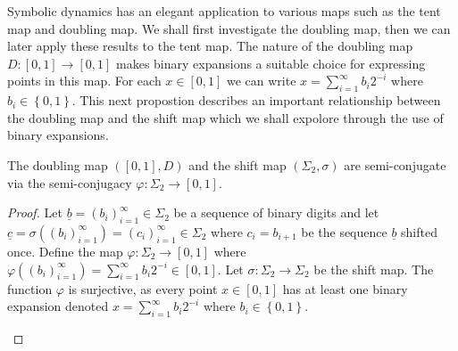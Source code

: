 Symbolic dynamics has an elegant application to various maps such as the tent map and doubling map. We shall first investigate the doubling map, then we can later apply these results to the tent map. The nature of the doubling map $D: [0, 1] \to [0, 1]$ makes binary expansions a suitable choice for expressing points in this map. For each $x \in [0, 1]$ we can write $x=\sum_{i=1}^{\infty}b_i2^{-i}$ where $b_i \in \left\lbrace 0, 1 \right\rbrace$. This next propostion describes an important relationship between the doubling map and the shift map which we shall expolore through the use of binary expansions.

\begin{prop} \label{prop:doubling-shift-semi-conjugate}
    The doubling map $([0, 1], D)$ and the shift map $(\Sigma_2, \sigma)$ are semi-conjugate via the semi-conjugacy $\varphi: \Sigma_2 \to [0, 1]$.
    \begin{proof}
        Let $\underline{b} = (b_i)_{i=1}^{\infty} \in \Sigma_2$ be a sequence of binary digits and let $\underline{c} = \sigma\left((b_i)_{i=1}^{\infty}\right) = (c_i)_{i=1}^{\infty} \in \Sigma_2$ where $c_i = b_{i + 1}$ be the sequence $\underline{b}$ shifted once. Define the map $\varphi: \Sigma_2 \to [0, 1]$ where $\varphi\left((b_i)_{i=1}^{\infty}\right) = \sum_{i=1}^{\infty} b_i2^{-i} \in [0, 1]$. Let $\sigma: \Sigma_2 \to \Sigma_2$ be the shift map. The function $\varphi$ is surjective, as every point $x \in [0, 1]$ has at least one binary expansion denoted $x=\sum_{i=1}^{\infty}b_i2^{-i}$ where $b_i \in \left\lbrace 0, 1 \right\rbrace$.
        \begin{center}
\end{center}
\end{proof}
\end{prop}
